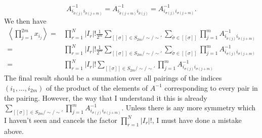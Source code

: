 \documentclass{article}
\begin{document}
$$A^{-1}_{i_{\tilde{\sigma}(j)}i_{\tilde{\sigma}(j+m)}}=A^{-1}_{i_{\tilde{\sigma}(j+m)}i_{\tilde{\sigma}(j)}}=A^{-1}_{i_{\sigma(j)}i_{\sigma(j+m)}}.$$
We then have
$$\begin{aligned}\left\langle \prod_{j=1}^{2m}x_{i_j}\right\rangle=&\prod_{r=1}^N|I_r|!\frac{1}{2^m}\sum_{[[\sigma]]\in S_{2m}/\sim/\sim'}\sum_{\tilde{\sigma}\in[[\sigma]]}\prod_{j=1}^m A^{-1}_{i_{\tilde{\sigma}(j)}i_{\tilde{\sigma}(j+m)}}\\
=&\prod_{r=1}^N|I_r|!\frac{1}{2^m}\sum_{[[\sigma]]\in S_{2m}/\sim/\sim'}\sum_{\tilde{\sigma}\in[[\sigma]]}\prod_{j=1}^m A^{-1}_{i_{\sigma(j)}i_{\sigma(j+m)}}\\
=&\prod_{r=1}^N|I_r|!\sum_{[[\sigma]]\in S_{2m}/\sim/\sim'}\prod_{j=1}^m A^{-1}_{i_{\sigma(j)}i_{\sigma(j+m)}}\end{aligned}$$
The final result should be a summation over all pairings of the indices $(i_1,\dots,i_{2m})$ of the product of the elements of $A^{-1}$ corresponding to every pair in the pairing. However, the way that I understand it this is already $\sum_{[[\sigma]]\in S_{2m}/\sim/\sim'}\prod_{j=1}^m A^{-1}_{i_{\sigma(j)}i_{\sigma(j+m)}}$. Unless there is any more symmetry which I haven't seen and cancels the factor $\prod_{r=1}^N|I_r|!$, I must have done a mistake above.
\end{document}
